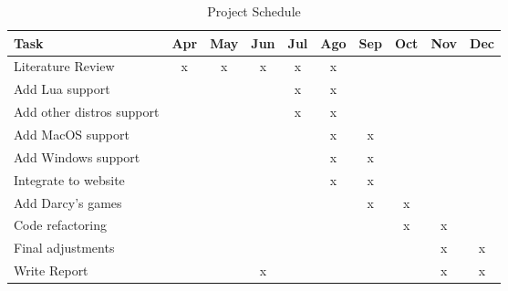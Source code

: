 \begin{table}[h!]
\centering
\caption{Project Schedule}
\label{tab:schedule}
\begin{tabular}{|l|c|c|c|c|c|c|c|c|c|}
\hline
\textbf{Task} & \multicolumn{1}{l|}{\textbf{Apr}} & \multicolumn{1}{l|}{\textbf{May}} & \multicolumn{1}{l|}{\textbf{Jun}} & \multicolumn{1}{l|}{\textbf{Jul}} & \multicolumn{1}{l|}{\textbf{Ago}} & \multicolumn{1}{l|}{\textbf{Sep}} & \multicolumn{1}{l|}{\textbf{Oct}} & \multicolumn{1}{l|}{\textbf{Nov}} & \multicolumn{1}{l|}{\textbf{Dec}} \\ \hline
Literature Review & x & x & x & x & x &  &  &  &  \\ \hline
Add Lua support &  &  &  & x & x &  &  &  &  \\ \hline
Add other distros support &  &  &  & x & x &  &  &  &  \\ \hline
Add MacOS support &  &  &  &  & x & x &  &  &  \\ \hline
Add Windows support &  &  &  &  & x & x &  &  &  \\ \hline
Integrate to website &  &  &  &  & x & x &  &  &  \\ \hline
Add Darcy's games &  &  &  &  &  & x & x &  &  \\ \hline
Code refactoring &  &  &  &  &  &  & x & x &  \\ \hline
Final adjustments &  &  &  &  &  &  &  & x & x \\ \hline
Write Report &  &  & x &  &  &  &  & x & x \\ \hline
\end{tabular}
\end{table}
